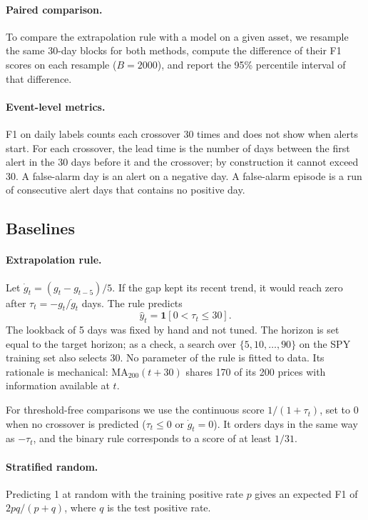 \documentclass[11pt,a4paper]{article}
\newcommand{\ind}{\mathbf{1}}
\begin{document}
\paragraph{Paired comparison.} To compare the extrapolation rule with a model on a given asset,
we resample the same 30-day blocks for both methods, compute the difference of their F1 scores on
each resample ($B=2000$), and report the 95\% percentile interval of that difference.

\paragraph{Event-level metrics.} F1 on daily labels counts each crossover 30 times and does not
show when alerts start. For each crossover, the lead time is the number of days between the first
alert in the 30 days before it and the crossover; by construction it cannot exceed 30. A
false-alarm day is an alert on a negative day. A false-alarm episode is a run of consecutive
alert days that contains no positive day.

\subsection{Baselines}

\paragraph{Extrapolation rule.} Let $\dot g_t = (g_t - g_{t-5})/5$. If the gap kept its recent
trend, it would reach zero after $\tau_t = -g_t/\dot g_t$ days. The rule predicts
\begin{equation}
  \hat y_t = \ind\left[0 < \tau_t \le 30\right].
\end{equation}
The lookback of 5 days was fixed by hand and not tuned. The horizon is set equal to the target
horizon; as a check, a search over $\{5,10,\dots,90\}$ on the SPY training set also selects 30.
No parameter of the rule is fitted to data. Its rationale is mechanical:
$\mathrm{MA}_{200}(t+30)$ shares 170 of its 200 prices with information available at $t$.

For threshold-free comparisons we use the continuous score $1/(1+\tau_t)$, set to 0 when no
crossover is predicted ($\tau_t \le 0$ or $\dot g_t = 0$). It orders days in the same way as
$-\tau_t$, and the binary rule corresponds to a score of at least $1/31$.

\paragraph{Stratified random.} Predicting 1 at random with the training positive rate $p$ gives an
expected F1 of $2pq/(p+q)$, where $q$ is the test positive rate.
\end{document}
